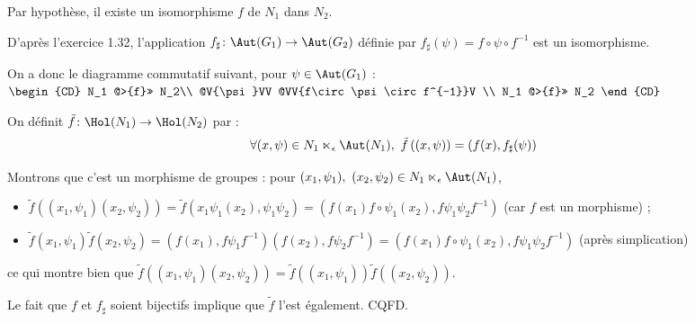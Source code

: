 

Par hypothèse, il existe un isomorphisme $f$ de $N_1$ dans $N_2$.

D'après l'exercice 1.32, l'application $f_\sharp\colon\Aut(G_1)\to\Aut(G_2)$ définie par $f_\sharp(\psi) = f\circ\psi\circ f^{-1}$ est un isomorphisme.

On a donc le diagramme commutatif suivant, pour $\psi \in \Aut(G_1)$  :  \hspace{1cm}  $\begin{CD}
    N_1 @>{f}>> N_2\\
    @V{\psi}VV @VV{f\circ\psi\circ f^{-1}}V \\
    N_1 @>{f}>> N_2
    \end{CD}$

On définit $\tilde{f}\colon\Hol(N_1)\to \Hol(N_2)$ par :
\[\forall (x,\psi)\in N_1 \ltimes_{\epsilon} \Aut(N_1),~ \tilde{f}\left((x,\psi)\right) = \left(f(x),f_\sharp(\psi) \right) \]

Montrons que c'est un morphisme de groupes : pour $ (x_1,\psi_1),~ (x_2,\psi_2) \in N_1 \ltimes_{\epsilon} \Aut(N_1)$,
\begin{itemize}
 \item $\tilde{f}\left(  (x_1,\psi_1) (x_2,\psi_2)\right) = \tilde{f}\left( x_1\psi_1(x_2), \psi_1\psi_2\right) = \left(f(x_1)f\circ\psi_1(x_2), f\psi_1\psi_2f^{-1} \right)$ (car $f$ est un morphisme) ;
  \item $\tilde{f}\left(x_1,\psi_1\right)\tilde{f}\left(x_2,\psi_2\right) = \left(f(x_1),f\psi_1f^{-1}\right)\left(f(x_2),f\psi_2f^{-1}\right) = \left(f(x_1)f\circ\psi_1(x_2), f\psi_1\psi_2f^{-1} \right)$ (après simplication)
\end{itemize}
ce qui montre bien que  $\tilde{f}\left(  (x_1,\psi_1) (x_2,\psi_2)\right) = \tilde{f}\left((x_1,\psi_1)\right)\tilde{f}\left((x_2,\psi_2)\right)$.\medskip

Le fait que $f$ et $f_\sharp$ soient bijectifs implique que $\tilde{f}$ l'est également. CQFD.

